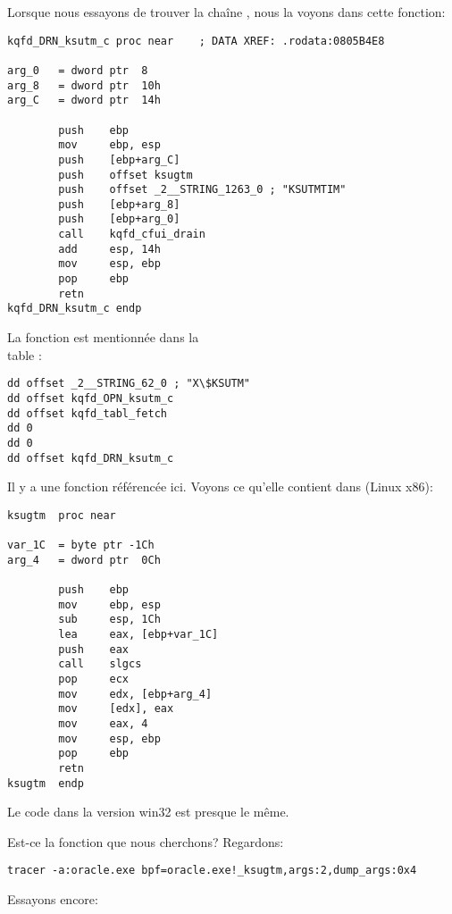 Lorsque nous essayons de trouver la chaîne , nous la voyons dans cette
fonction:

\begin{lstlisting}[style=customasmx86]
kqfd_DRN_ksutm_c proc near    ; DATA XREF: .rodata:0805B4E8

arg_0   = dword ptr  8
arg_8   = dword ptr  10h
arg_C   = dword ptr  14h

        push    ebp
        mov     ebp, esp
        push    [ebp+arg_C]
        push    offset ksugtm
        push    offset _2__STRING_1263_0 ; "KSUTMTIM"
        push    [ebp+arg_8]
        push    [ebp+arg_0]
        call    kqfd_cfui_drain
        add     esp, 14h
        mov     esp, ebp
        pop     ebp
        retn
kqfd_DRN_ksutm_c endp
\end{lstlisting}

La fonction  est mentionnée dans la \\
table :

\begin{lstlisting}[style=customasmx86]
dd offset _2__STRING_62_0 ; "X\$KSUTM"
dd offset kqfd_OPN_ksutm_c
dd offset kqfd_tabl_fetch
dd 0
dd 0
dd offset kqfd_DRN_ksutm_c
\end{lstlisting}

Il y a une fonction  référencée ici.
Voyons ce qu'elle contient dans (Linux x86):

\begin{lstlisting}[caption=ksu.o,style=customasmx86]
ksugtm  proc near

var_1C  = byte ptr -1Ch
arg_4   = dword ptr  0Ch

        push    ebp
        mov     ebp, esp
        sub     esp, 1Ch
        lea     eax, [ebp+var_1C]
        push    eax
        call    slgcs
        pop     ecx
        mov     edx, [ebp+arg_4]
        mov     [edx], eax
        mov     eax, 4
        mov     esp, ebp
        pop     ebp
        retn
ksugtm  endp
\end{lstlisting}

Le code dans la version win32 est presque le même.

Est-ce la fonction que nous cherchons? Regardons:

\begin{lstlisting}
tracer -a:oracle.exe bpf=oracle.exe!_ksugtm,args:2,dump_args:0x4
\end{lstlisting}

Essayons encore:

